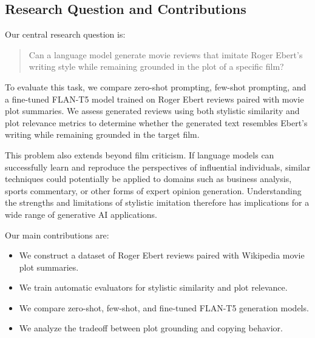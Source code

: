 \subsection{Research Question and Contributions}

Our central research question is:

\begin{quote}
Can a language model generate movie reviews that imitate Roger Ebert's writing style while remaining grounded in the plot of a specific film?
\end{quote}

To evaluate this task, we compare zero-shot prompting, few-shot prompting, and a fine-tuned FLAN-T5 model trained on Roger Ebert reviews paired with movie plot summaries. We assess generated reviews using both stylistic similarity and plot relevance metrics to determine whether the generated text resembles Ebert's writing while remaining grounded in the target film.

This problem also extends beyond film criticism. If language models can successfully learn and reproduce the perspectives of influential individuals, similar techniques could potentially be applied to domains such as business analysis, sports commentary, or other forms of expert opinion generation. Understanding the strengths and limitations of stylistic imitation therefore has implications for a wide range of generative AI applications.

Our main contributions are:

\begin{itemize}
    \item We construct a dataset of Roger Ebert reviews paired with Wikipedia movie plot summaries.
    \item We train automatic evaluators for stylistic similarity and plot relevance.
    \item We compare zero-shot, few-shot, and fine-tuned FLAN-T5 generation models.
    \item We analyze the tradeoff between plot grounding and copying behavior.
\end{itemize}
